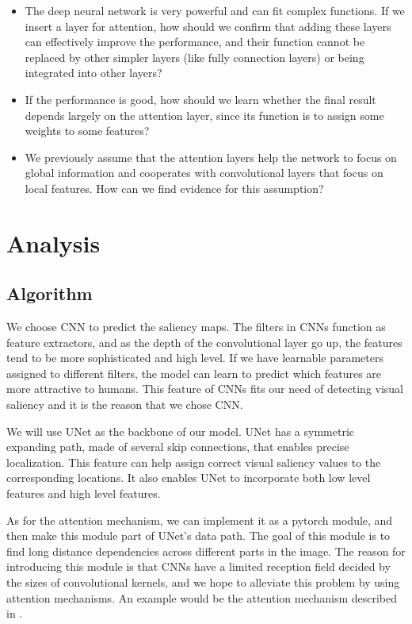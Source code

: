 \documentclass[12pt]{article}
\begin{document}
\begin{itemize}
    \item The deep neural network is very powerful and can fit complex functions. If we insert a layer for attention, how should we confirm that adding these layers can effectively improve the performance, and their function cannot be replaced by other simpler layers (like fully connection layers) or being integrated into other layers?
    \item If the performance is good, how should we learn whether the final result depends largely on the attention layer, since its function is to assign some weights to some features?
    \item We previously assume that the attention layers help the network to focus on global information and cooperates with convolutional layers that focus on local features. How can we find evidence for this assumption?
\end{itemize}

\section{Analysis}
\subsection{Algorithm}
We choose CNN to predict the saliency maps. The filters in CNNs function as feature extractors,
and as the depth of the convolutional layer go up, the features tend to be more sophisticated
and high level. If we have learnable parameters assigned to different filters, the model can
learn to predict which features are more attractive to humans. 
This feature of CNNs fits our need of detecting visual saliency and it is the reason that we 
chose CNN.

We will use UNet \cite{ronnebergerUNetConvolutionalNetworks2015} as the backbone of our model. UNet has a symmetric expanding path, made of
several skip connections, that enables precise localization. This feature can help assign correct visual saliency values 
to the corresponding locations. It also enables UNet to incorporate both low level features and
high level features.

As for the attention mechanism, we can implement it as a pytorch module, and then make this module
part of UNet's data path. The goal of this module is to find long distance dependencies across 
different parts in the image. The reason for introducing this module is that CNNs have a limited
reception field decided by the sizes of convolutional kernels, and we hope to alleviate this problem
by using attention mechanisms. An example would be the attention mechanism described in \cite{zhangSelfAttentionGenerativeAdversarial2019a}.
\end{document}

